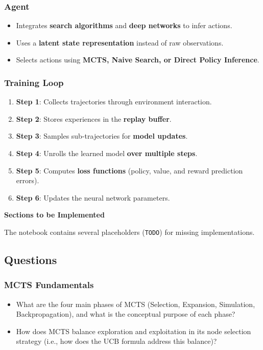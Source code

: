 \subsubsection{Agent}
\begin{itemize}
    \item Integrates \textbf{search algorithms} and \textbf{deep networks} to infer actions.
    \item Uses a \textbf{latent state representation} instead of raw observations.
    \item Selects actions using \textbf{MCTS, Naive Search, or Direct Policy Inference}.
\end{itemize}

\subsubsection{Training Loop}
\begin{enumerate}
    \item \textbf{Step 1}: Collects trajectories through environment interaction.
    \item \textbf{Step 2}: Stores experiences in the \textbf{replay buffer}.
    \item \textbf{Step 3}: Samples sub-trajectories for \textbf{model updates}.
    \item \textbf{Step 4}: Unrolls the learned model \textbf{over multiple steps}.
    \item \textbf{Step 5}: Computes \textbf{loss functions} (policy, value, and reward prediction errors).
    \item \textbf{Step 6}: Updates the neural network parameters.
\end{enumerate}

\textbf{Sections to be Implemented}

The notebook contains several placeholders (\texttt{TODO}) for missing implementations.
\subsection{Questions}

\subsubsection{MCTS Fundamentals}
\begin{itemize}
    \item What are the four main phases of MCTS (Selection, Expansion, Simulation, Backpropagation), and what is the conceptual purpose of each phase?
    \item How does MCTS balance exploration and exploitation in its node selection strategy (i.e., how does the UCB formula address this balance)?
\end{itemize}

